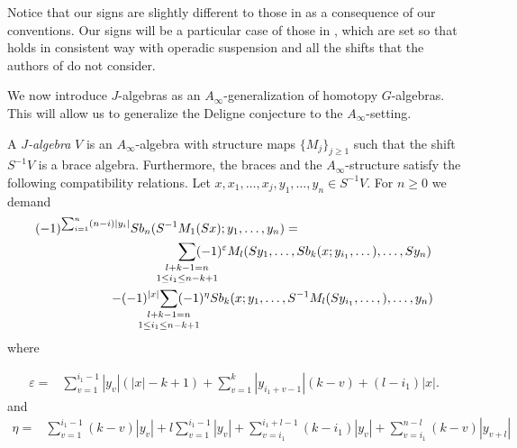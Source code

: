 \documentclass[Thesis.tex]{subfiles}
\begin{document}
Notice that our signs are slightly different to those in \cite{GV} as a consequence of our conventions. Our signs will be a particular case of those in , which are set so that  holds in consistent way with operadic suspension and all the shifts that the authors of \cite{GV} do not consider.

We now introduce $J$-algebras as an $A_\infty$-generalization of homotopy $G$-algebras. This will allow us to generalize the Deligne conjecture to the $A_\infty$-setting. %
\pagebreak
\begin{defin}\label{Jalgebras}
A \emph{$J$-algebra} $V$ is an $A_\infty$-algebra with structure maps $\{M_j\}_{j\geq 1}$ such that the shift $S^{-1}V$ is a brace algebra. Furthermore, the braces and the $A_\infty$-structure satisfy the following compatibility relations. Let $x, x_1,\dots, x_j, y_1,\dots, y_n\in S^{-1}V$. For $n\geq 0$ we demand 
\begin{align*}
(-1)^{\sum_{i=1}^n(n-i)|y_i|}Sb_n(S^{-1}&M_1(Sx);y_1,\dots, y_n)=\\
&\underset{\mathclap{1\leq i_1\leq n-k+1}}{\sum_{\mathclap{l+k-1=n}}}(-1)^{\varepsilon}M_l(Sy_1,\dots, Sb_{k}(x;y_{i_1},\dots),\dots, Sy_n)\\
-(-1)^{|x|}\underset{\mathclap{1\leq i_1\leq n-k+1}}{\sum_{\mathclap{l+k-1=n}}}&(-1)^{\eta} Sb_k(x;y_1,\dots, S^{-1}M_l(Sy_{i_1},\dots,), \dots, y_n)
\end{align*}
where

%
\begin{align*}
\varepsilon = &\sum_{v=1}^{i_1-1}|y_v|(|x|-k+1)+\sum_{v=1}^{k}|y_{i_1+v-1}|(k-v)+(l-i_1)|x|.
\end{align*}
and
\begin{align*}
\eta=& \sum_{v=1}^{i_1-1}(k-v)|y_v|+l\sum_{v=1}^{i_1-1}|y_v|+\sum_{v=i_1}^{i_1+l-1}(k-i_1)|y_v|+\sum_{v=i_1}^{n-l}(k-v)|y_{v+l}|
\end{align*}


\end{defin}
\end{document}
